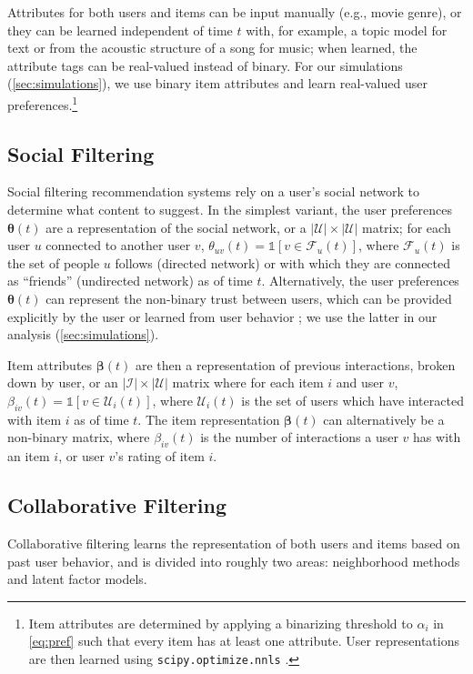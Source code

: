 \documentclass[sigconf]{acmart}
\begin{document}
Attributes for both users and items can be input manually (e.g., movie genre), or they can be learned independent of time $t$ with, for example, a topic model \citep{Blei:2012} for text or from the acoustic structure of a song \citep{tingle2010exploring} for music; when learned, the attribute tags can be real-valued instead of binary.
For our simulations (\cref{sec:simulations}), we use binary item attributes and learn real-valued user preferences.\footnote{Item attributes are determined by applying a binarizing threshold to $\alpha_i$ in \cref{eq:pref} such that every item has at least one attribute.  User representations are then learned using \texttt{scipy.optimize.nnls} \citep{scipy}.}


\subsection{Social Filtering}
\label{sec:social}
Social filtering recommendation systems rely on a user's social network to determine what content to suggest.  In the simplest variant, the user preferences $\boldsymbol{\theta}(t)$ are a representation of the social network, or a $|\mathcal{U}| \times |\mathcal{U}|$ matrix; for each user $u$ connected to another user $v$, $\theta_{uv}(t) = \mathds{1}\left[v \in \mathcal{F}_u(t) \right]$,
where $\mathcal{F}_u(t)$ is the set of people $u$ follows (directed network) or with which they are connected as ``friends'' (undirected network) as of time $t$. Alternatively, the user preferences $\boldsymbol{\theta}(t)$ can represent the non-binary trust between users, which can be provided explicitly by the user \citep{Massa2007} or learned from user behavior \citep{Chaney:2015}; we use the latter in our analysis (\cref{sec:simulations}).

Item attributes $\boldsymbol{\beta}(t)$ are then a representation of previous interactions, broken down by user, or an $|\mathcal{I}| \times |\mathcal{U}|$ matrix where for each item $i$ and user $v$,
$\beta_{iv}(t) = \mathds{1}\left[v \in \mathcal{U}_i(t) \right]$,
where $\mathcal{U}_i(t)$ is the set of users which have interacted with item $i$ as of time $t$.
The item representation $\boldsymbol{\beta}(t)$ can alternatively be a non-binary matrix, where $\beta_{iv}(t)$ is the number of interactions a user $v$ has with an item $i$, or user $v$'s rating of item $i$.

\subsection{Collaborative Filtering}
\label{sec:collaborative_filtering}
Collaborative filtering learns the representation of both users and items based on past user behavior, and is divided into roughly two areas: neighborhood methods and latent factor models.  
\end{document}
